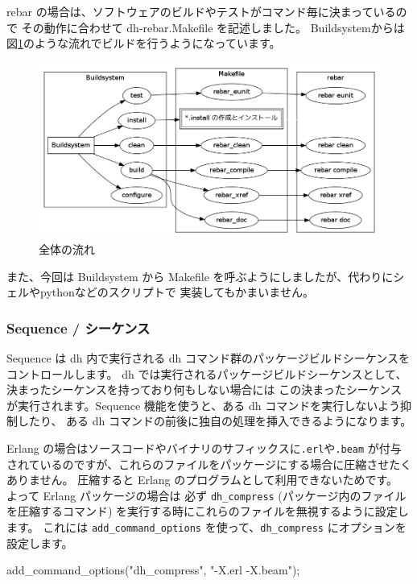 \documentclass[mingoth,a4paper,twoside]{jsarticle}
\begin{document}
rebar の場合は、ソフトウェアのビルドやテストがコマンド毎に決まっているので
その動作に合わせて dh-rebar.Makefile を記述しました。
Buildsystemからは 図\ref{fig:debhelper-image01}のような流れでビルドを行うようになっています。

\begin{figure}[h!]
  \centering
  \includegraphics[width=0.7\hsize]{image2013-gum/buildsystem.png}
  \caption{全体の流れ}
  \label{fig:debhelper-image01}
  \vspace{-1.5em}
\end{figure}

また、今回は Buildsystem から Makefile を呼ぶようにしましたが、代わりにシェルやpythonなどのスクリプトで
実装してもかまいません。

\subsubsection{Sequence / シーケンス}

Sequence は dh 内で実行される dh コマンド群のパッケージビルドシーケンスをコントロールします。
dh では実行されるパッケージビルドシーケンスとして、決まったシーケンスを持っており何もしない場合には
この決まったシーケンスが実行されます。Sequence 機能を使うと、ある dh コマンドを実行しないよう抑制したり、
ある dh コマンドの前後に独自の処理を挿入できるようになります。

Erlang の場合はソースコードやバイナリのサフィックスに\texttt{.erl}や\texttt{.beam}
が付与されているのですが、これらのファイルをパッケージにする場合に圧縮させたくありません。
圧縮すると Erlang のプログラムとして利用できないためです。
よって Erlang パッケージの場合は 必ず \texttt{dh\_compress} (パッケージ内のファイルを圧縮するコマンド)
を実行する時にこれらのファイルを無視するように設定します。
これには \texttt{add\_command\_options} を使って、\texttt{dh\_compress} にオプションを設定します。

\begin{commandline}
add_command_options("dh_compress", "-X.erl -X.beam");
\end{commandline}
\end{document}
